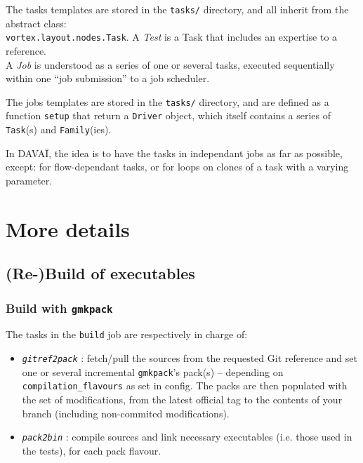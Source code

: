 \documentclass[a4paper,10pt,twoside]{article}
\begin{document}
The tasks templates are stored in the \texttt{tasks/} directory, and all inherit from the abstract class:\\ \texttt{vortex.layout.nodes.Task}.
A \textit{Test} is a Task that includes an expertise to a reference.\\

A \textit{Job} is understood as a series of one or several tasks, executed sequentially within one ``job submission'' to a job scheduler.

The jobs templates are stored in the \texttt{tasks/} directory, and are defined as a function \texttt{setup} that return a \texttt{Driver} object, which itself contains a series of \texttt{Task}(s) and \texttt{Family}(ies).

In DAVAÏ, the idea is to have the tasks in independant jobs as far as possible, except: for flow-dependant tasks, or for loops on clones of a task with a varying parameter.








\newpage
\section{More details\label{sect:options}}

\subsection{(Re-)Build of executables}
\subsubsection{Build with \texttt{gmkpack}}
The tasks in the \texttt{build} job are respectively in charge of:
\begin{itemize}
 \item \texttt{\textit{gitref2pack}} : fetch/pull the sources from the requested Git reference and set one or several incremental \texttt{gmkpack}'s pack(s) -- depending on \texttt{compilation\_flavours} as set in config. The packs are then populated with the set of modifications, from the latest official tag to the contents of your branch (including non-commited modifications).
 \item \texttt{\textit{pack2bin}} : compile sources and link necessary executables (i.e. those used in the tests), for each pack flavour.
\end{itemize}
\end{document}
